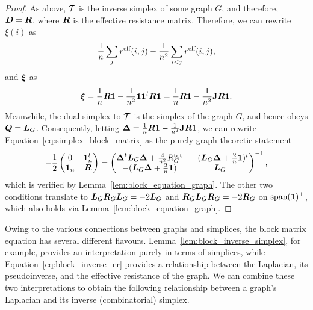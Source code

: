 \begin{proof}
As above, $\mathcal{T}$ is the inverse simplex of some graph $G$, and therefore, $\vb*{D}=\vb*{R}$, where $\vb*{R}$ is the effective resistance matrix. Therefore, we can rewrite $\xi(i)$ as 
 \begin{align*}
\frac{1}{n}\sum_j r^{\textnormal{eff}}(i,j) - \frac{1}{n^2}\sum_{i<j}r^{\textnormal{eff}}(i,j),
\end{align*}
and $\vb*{\xi}$ as 
\begin{align*}
\vb*{\xi} = \frac{1}{n}\vb*{R}\vb{1} - \frac{1}{n^2} \vb{1} \vb{1}^t \vb*{R}\vb{1} = \frac{1}{n}\vb*{R}\vb{1} - \frac{1}{n^2} \vb{J} \vb*{R}\vb{1}.
\end{align*}
Meanwhile, the dual simplex to $\mathcal{T}$ is the simplex of the graph $G$, and hence obeys $\vb*{Q}=\vb*{L}_G$. Consequently, letting $\vb*{\Delta}=\frac{1}{n}\vb*{R}\vb{1} - \frac{1}{n^2} \vb{J} \vb*{R}\vb{1}$, we can rewrite Equation~\eqref{eq:simplex_block_matrix} as the purely graph theoretic statement  
\begin{equation*}
	-\frac{1}{2} \begin{pmatrix}
0 & \vb{1}_n^t \\ 
\vb{1}_n &  \vb*{R}
\end{pmatrix} = 
\begin{pmatrix}
\vb*{\Delta}^t \vb*{L}_G\vb*{\Delta} + \frac{4}{n^2}R^{\textnormal{tot}}_G & -(\vb*{L}_G\vb*{\Delta} + \frac{2}{n}\vb{1})^t \\
-(\vb*{L}_G\vb*{\Delta} + \frac{2}{n}\vb{1}) & \vb*{L}_G
\end{pmatrix}^{-1},
\end{equation*}
which  is verified by Lemma~\ref{lem:block_equation_graph}. The other two conditions translate  to $\vb*{L}_G\vb*{R}_G\vb*{L}_G=-2\vb*{L}_G$ and $\vb*{R}_G\vb*{L}_G\vb*{R}_G=-2\vb*{R}_G$ on $\textnormal{span}(\vb{1})^\perp$,  which also holds  via Lemma~\ref{lem:block_equation_graph}. 
\end{proof}

Owing to the various connections between graphs and simplices, the block matrix equation has several different flavours. Lemma~\ref{lem:block_inverse_simplex}, for example, provides an interpretation purely in terms of simplices, while Equation~\eqref{eq:block_inverse_er} provides a relationship between the Laplacian, its pseudoinverse, and  the effective resistance of the graph. 
We can combine  these two interpretations to obtain the following relationship between a graph's Laplacian and its inverse (combinatorial) simplex. 


